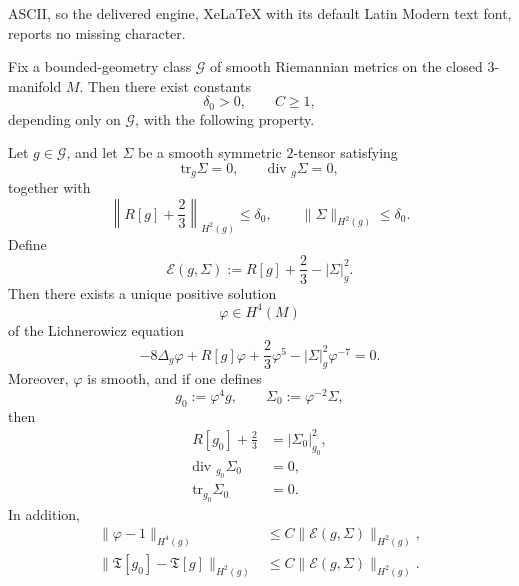 \documentclass[10pt,a4paper]{amsart}
\newcommand{\tr}{\text{tr}}
\renewcommand{\div}{\mbox{div }}
\begin{document}
ASCII, so the delivered engine, XeLaTeX with its default Latin Modern text font, reports no missing character.
\begin{proposition}
\label{prop:conformal-correction}
Fix a bounded-geometry class \(\mathcal G\) of smooth Riemannian metrics on the closed
\(3\)-manifold \(M\). Then there exist constants
\[
\delta_{0}>0,\qquad C\ge 1,
\]
depending only on \(\mathcal G\), with the following property.

\noindent Let \(g\in \mathcal G\), and let \(\Sigma\) be a smooth symmetric \(2\)-tensor satisfying
\[
\tr_{g}\Sigma=0,\qquad \div_{g}\Sigma=0,
\]
together with
\[
\left\|R[g]+\frac23\right\|_{H^{2}(g)}\le \delta_{0},
\qquad
\|\Sigma\|_{H^{2}(g)}\le \delta_{0}.
\]
Define
\[
\mathcal E(g,\Sigma):=R[g]+\frac23-|\Sigma|_{g}^{2}.
\]
Then there exists a unique positive solution
\[
\varphi\in H^{4}(M)
\]
of the Lichnerowicz equation
\begin{equation}
\label{eq:Lichnerowicz-exact-corrected}
-8\Delta_{g}\varphi + R[g]\varphi + \frac23 \varphi^{5} - |\Sigma|_{g}^{2}\varphi^{-7}=0.
\end{equation}
Moreover, \(\varphi\) is smooth, and if one defines
\[
g_{0}:=\varphi^{4}g,\qquad \Sigma_{0}:=\varphi^{-2}\Sigma,
\]
then
\begin{align}
R[g_{0}]+\frac23&=|\Sigma_{0}|_{g_{0}}^{2},\\
\div_{g_{0}}\Sigma_{0}&=0,\\
\tr_{g_{0}}\Sigma_{0}&=0.
\end{align}
In addition,
\begin{align}
\label{eq:phi-close-corrected}
\|\varphi-1\|_{H^{4}(g)}
&\leq
C\|\mathcal E(g,\Sigma)\|_{H^{2}(g)},\\
\label{eq:T-change-corrected}
\|\mathfrak T[g_{0}]-\mathfrak T[g]\|_{H^{2}(g)}
&\leq
C\|\mathcal E(g,\Sigma)\|_{H^{2}(g)}.
\end{align}
\end{proposition}
\end{document}
